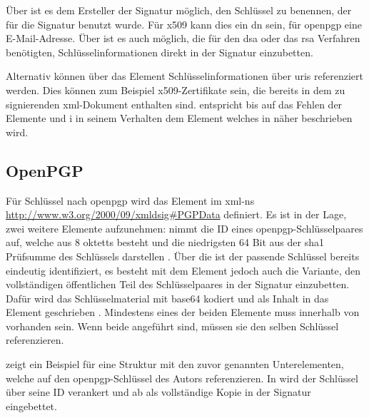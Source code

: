 Über  ist es dem Ersteller der Signatur möglich, den Schlüssel zu benennen, der für die Signatur benutzt wurde. Für \gls{x509} kann dies ein
\gls{dn} sein, für \gls{openpgp} eine E-Mail-Adresse. Über  ist es auch möglich, die für den \gls{dsa} oder das \gls{rsa} Verfahren
benötigten, Schlüsselinformationen direkt in der Signatur einzubetten.  

Alternativ können über das Element  Schlüsselinformationen über \glspl{uri} referenziert werden. Dies können zum Beispiel
\gls{x509}-Zertifikate sein, die bereits in dem zu signierenden \gls{xml}-Dokument enthalten sind.  entspricht bis auf
das Fehlen der Elemente  und i in seinem Verhalten dem Element  welches in 
 näher beschrieben wird.

\subsection{OpenPGP}
Für Schlüssel nach \gls{openpgp} wird das Element  im \gls{xml-ns} \url{http://www.w3.org/2000/09/xmldsig#PGPData} definiert. Es ist in der
Lage, zwei weitere Elemente aufzunehmen:  nimmt die ID eines \gls{openpgp}-Schlüsselpaares auf, welche aus 8 \glspl{oktett} besteht und die
niedrigsten 64 Bit aus der \gls{sha1} Prüfsumme des Schlüssels darstellen \cite{openpgp:ietf}. Über die  ist der passende Schlüssel bereits eindeutig
identifiziert, es besteht mit dem Element  jedoch auch die Variante, den vollständigen öffentlichen Teil des Schlüsselpaares in der
Signatur einzubetten. Dafür wird das Schlüsselmaterial mit \gls{base64} kodiert und als Inhalt in das Element geschrieben \cite{xml-dsig:w3c}. Mindestens eines
der beiden Elemente muss innerhalb von  vorhanden sein. Wenn beide angeführt sind, müssen sie den selben Schlüssel referenzieren.

 zeigt ein Beispiel für eine Struktur mit den zuvor genannten Unterelementen, welche auf den \gls{openpgp}-Schlüssel des Autors
referenzieren. In  wird der Schlüssel über seine ID verankert und ab  als
vollständige Kopie in der Signatur eingebettet.



